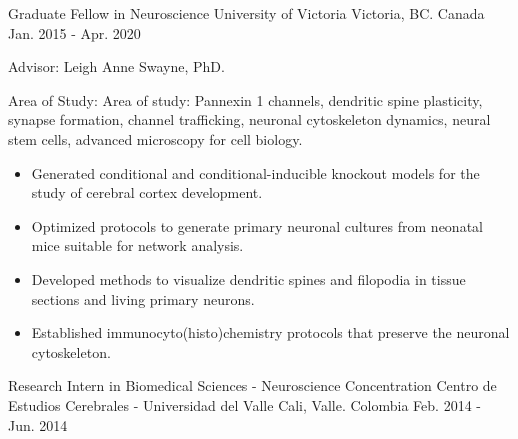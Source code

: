 

\begin{cventries}

  \cventry
    {Graduate Fellow in Neuroscience} %
    {University of Victoria} %
    {Victoria, BC. Canada} %
    {Jan. 2015 - Apr. 2020} %
    {
      \begin{cvitems} %
        \item {Advisor: Leigh Anne Swayne, PhD.}
        \item {Area of Study: Area of study: Pannexin 1 channels, dendritic spine plasticity, synapse formation, channel trafficking, neuronal cytoskeleton dynamics, neural stem cells, advanced microscopy for cell biology.}
        \begin{itemize}
          \begin{itemize}
            \item {Generated conditional and conditional-inducible knockout models for the study of cerebral cortex development.}
            \item {Optimized protocols to generate primary neuronal cultures from neonatal mice suitable for network analysis.}
            \item {Developed methods to visualize dendritic spines and filopodia in tissue sections and living primary neurons.}
            \item {Established immunocyto(histo)chemistry protocols that preserve the neuronal cytoskeleton.}
            \end{itemize}
        \end{itemize}
      \end{cvitems}
    }
  \cventry
    {Research Intern in Biomedical Sciences - Neuroscience Concentration} %
    {Centro de Estudios Cerebrales - Universidad del Valle} %
    {Cali, Valle. Colombia} %
    {Feb. 2014 - Jun. 2014} %
    {
      \begin{cvitems} %

\end{cvitems}}
\end{cventries}
